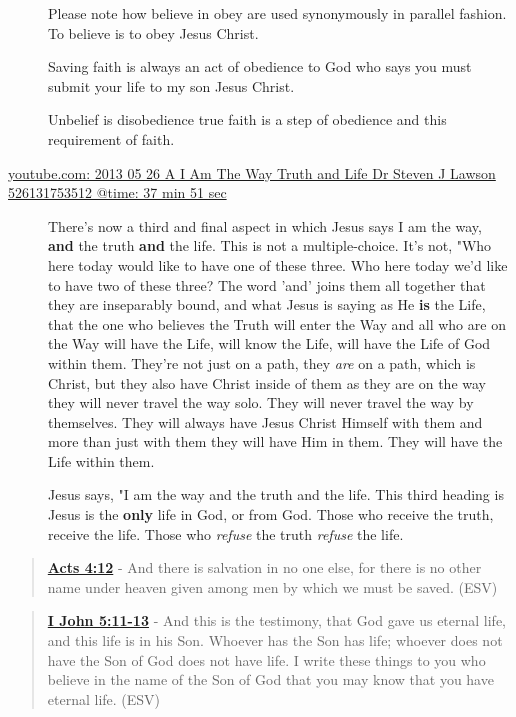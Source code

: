 \documentclass[11pt]{article}
\begin{document}
\begin{description}
Please note how believe in obey are used
synonymously in parallel fashion. To
believe is to obey Jesus Christ.

Saving faith is always an act of
obedience to God who says you must
submit your life to my son Jesus Christ.

Unbelief is disobedience true faith is a
step of obedience and this requirement
of faith.

\item[{\href{https://youtube.com/watch?v=-33jh183A1s\&t=2271}{youtube.com: 2013 05 26 A I Am The Way  Truth and Life   Dr  Steven J  Lawson   526131753512 @time: 37 min 51 sec}}] There's now a third and final aspect
in which Jesus says I am the way, \textbf{and} the
truth \textbf{and} the life. This is not a
multiple-choice. It's not, "Who here today
would like to have one of these three.
Who here today we'd like to have two of
these three? The word 'and' joins them
all together that they are inseparably
bound, and what Jesus is saying as He \textbf{is}
the Life, that the one who believes the
Truth will enter the Way and all who are
on the Way will have the Life, will know
the Life, will have the Life of God
within them. They're not just on a path,
they \emph{are} on a path, which is Christ, but
they also have Christ inside of them as
they are on the way they will never
travel the way solo. They will never
travel the way by themselves. They will
always have Jesus Christ Himself with
them and more than just with them they
will have Him in them. They will have the
Life within them.

Jesus says, "I am the way
and the truth and the life. This third
heading is Jesus is the \textbf{only} life in God,
or from God. Those who receive the truth,
receive the life. Those who \emph{refuse} the
truth \emph{refuse} the life.
\end{description}

\begin{quote}
\textbf{\href{https://www.biblegateway.com/passage/?search=Acts\%204\%3A12\&version=ESV}{Acts 4:12}} - And there is salvation in no one else, for there is no other name under heaven given among men by which we must be saved. (ESV)
\end{quote}

\begin{quote}
\textbf{\href{https://www.biblegateway.com/passage/?search=1\%20John\%205\%3A11-13\&version=ESV}{I John 5:11-13}} - And this is the testimony, that God gave us eternal life, and this life is in his Son. Whoever has the Son has life; whoever does not have the Son of God does not have life. I write these things to you who believe in the name of the Son of God that you may know that you have eternal life. (ESV)
\end{quote}
\end{document}
